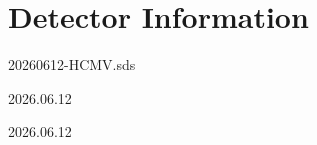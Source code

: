 \documentclass[UTF8,10pt,a4paper,fontset=fandol]{ctexart}
\newcommand{\handwritten}[1]{#1}
\begin{document}
\section*{Detector Information}

20260612-HCMV.sds


\handwritten{}

\handwritten{2026.06.12}

\handwritten{}

\handwritten{2026.06.12}

\newpage
\end{document}
